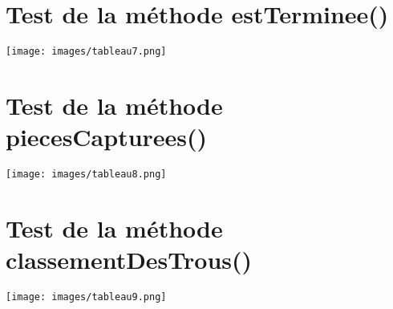 \documentclass[11pt,a4paper]{report}
\begin{document}
    \section{Test de la méthode estTerminee()}

        \texttt{[image: images/tableau7.png]}

    \section{Test de la méthode piecesCapturees()}

        \texttt{[image: images/tableau8.png]}

    \section{Test de la méthode classementDesTrous()}

        \texttt{[image: images/tableau9.png]}

    \begingroup
        \setlength{\parskip}{\baselineskip}
\end{document}
